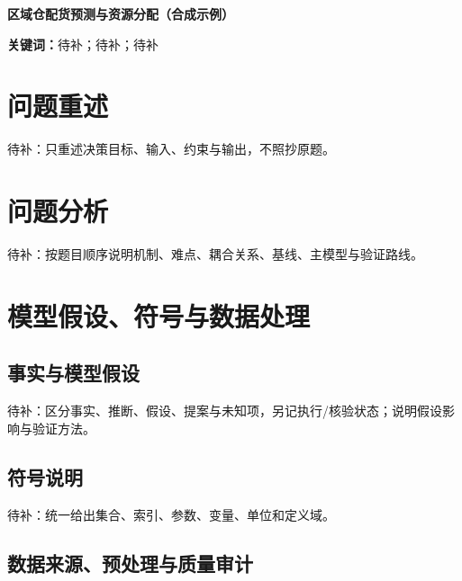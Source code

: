 \documentclass[UTF8,zihao=-4]{ctexart}
\newcommand{\papertitle}{区域仓配货预测与资源分配（合成示例）}
\begin{document}
\pagestyle{plain}
\setcounter{page}{1}

\begin{center}
  {\bfseries \papertitle\par}
\end{center}
\vspace{0.5em}

\begin{abstract}
待补：按“任务—逐问方法—关键定量结果及条件—验证证据—结论”的顺序撰写，并确保所有数字可追溯。
\end{abstract}

\noindent\textbf{关键词：}待补；待补；待补

\clearpage

\section{问题重述}

待补：只重述决策目标、输入、约束与输出，不照抄原题。

\section{问题分析}

待补：按题目顺序说明机制、难点、耦合关系、基线、主模型与验证路线。

\section{模型假设、符号与数据处理}

\subsection{事实与模型假设}

待补：区分事实、推断、假设、提案与未知项，另记执行/核验状态；说明假设影响与验证方法。

\subsection{符号说明}

待补：统一给出集合、索引、参数、变量、单位和定义域。

\subsection{数据来源、预处理与质量审计}
\end{document}
